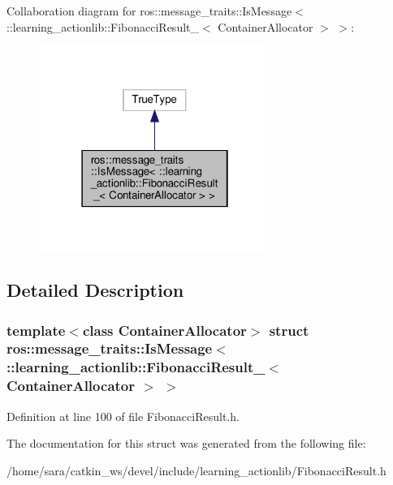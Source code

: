 Collaboration diagram for ros\+:\+:message\+\_\+traits\+:\+:Is\+Message$<$ \+:\+:learning\+\_\+actionlib\+:\+:Fibonacci\+Result\+\_\+$<$ Container\+Allocator $>$ $>$\+:
\nopagebreak
\begin{figure}[H]
\begin{center}
\leavevmode
\includegraphics[width=214pt]{structros_1_1message__traits_1_1IsMessage_3_01_1_1learning__actionlib_1_1FibonacciResult___3_01Cf78648fc1afb142969d5e7cbb01cf8bd}
\end{center}
\end{figure}


\subsection{Detailed Description}
\subsubsection*{template$<$class Container\+Allocator$>$\newline
struct ros\+::message\+\_\+traits\+::\+Is\+Message$<$ \+::learning\+\_\+actionlib\+::\+Fibonacci\+Result\+\_\+$<$ Container\+Allocator $>$ $>$}



Definition at line 100 of file Fibonacci\+Result.\+h.



The documentation for this struct was generated from the following file\+:\begin{DoxyCompactItemize}
\item 
/home/sara/catkin\+\_\+ws/devel/include/learning\+\_\+actionlib/Fibonacci\+Result.\+h\end{DoxyCompactItemize}
